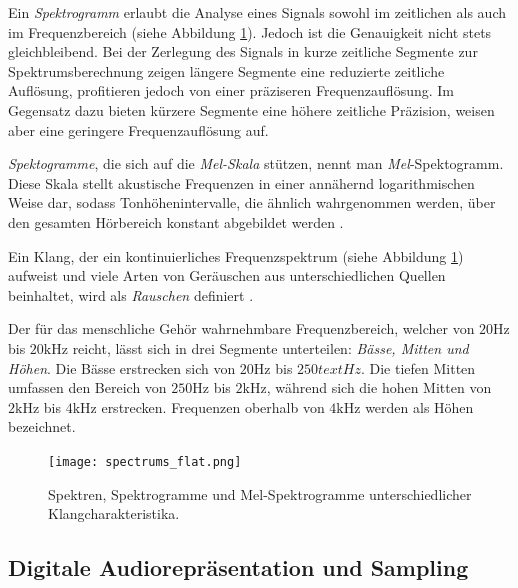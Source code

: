 \documentclass[
  a4paper,  %
  twoside,  %
  bibliography=totoc,
  headsepline,
  cleardoublepage=empty,
  parskip=half,
  draft=false
]{scrbook}
\begin{document}
Ein \emph{Spektrogramm} erlaubt die Analyse eines Signals sowohl im zeitlichen als auch im Frequenzbereich (siehe Abbildung \ref{fig:spectro}). Jedoch ist die Genauigkeit nicht stets gleichbleibend. Bei der Zerlegung des Signals in kurze zeitliche Segmente zur Spektrumsberechnung zeigen längere Segmente eine reduzierte zeitliche Auflösung, profitieren jedoch von einer präziseren Frequenzauflösung. Im Gegensatz dazu bieten kürzere Segmente eine höhere zeitliche Präzision, weisen aber eine geringere Frequenzauflösung auf. \cite{raffaseder_audiodesign_2010}

\emph{Spektogramme}, die sich auf die \emph{Mel-Skala} stützen, nennt man \emph{Mel}-Spektogramm. Diese Skala stellt akustische Frequenzen in einer annähernd logarithmischen Weise dar, sodass Tonhöhenintervalle, die ähnlich wahrgenommen werden, über den gesamten Hörbereich konstant abgebildet werden \cite{noauthor_librosamel_frequencies_nodate}.

Ein Klang, der ein kontinuierliches Frequenzspektrum (siehe Abbildung \ref{fig:spectro}) aufweist und viele Arten von Geräuschen aus unterschiedlichen Quellen beinhaltet, wird als \emph{Rauschen} definiert \cite{tsuji_physics_2021}.

Der für das menschliche Gehör wahrnehmbare Frequenzbereich, welcher von $20\text{Hz}$ bis $20\text{kHz}$ reicht, lässt sich in drei Segmente unterteilen: \emph{Bässe, Mitten und Höhen}. Die Bässe erstrecken sich von $20\text{Hz}$ bis $250text{Hz}$. Die tiefen Mitten umfassen den Bereich von $250\text{Hz}$ bis $2\text{kHz}$, während sich die hohen Mitten von $2\text{kHz}$ bis $4\text{kHz}$ erstrecken. Frequenzen oberhalb von $4\text{kHz}$ werden als Höhen bezeichnet. \cite{raffaseder_audiodesign_2010}

\begin{figure}
  \centering
  \texttt{[image: spectrums\_flat.png]}
  \caption[Spektren, Spektrogramme und Mel-Spektrogramme]{Spektren, Spektrogramme und Mel-Spektrogramme unterschiedlicher Klangcharakteristika.}
  \label{fig:spectro}
\end{figure}


\subsection{Digitale Audiorepräsentation und Sampling}
\end{document}
